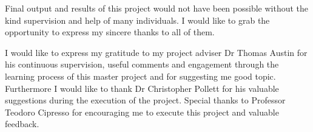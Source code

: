 Final output and results of this project would not have been possible without the kind supervision and help of many individuals. I would like to grab the opportunity to express my sincere thanks to all of them.

I would like to express my gratitude to my project adviser Dr Thomas Austin for his continuous supervision, useful comments and engagement through the learning process of this master project and for suggesting me good topic. Furthermore I would like to thank Dr Christopher Pollett for his valuable suggestions during the execution of the project. Special thanks to Professor Teodoro Cipresso for encouraging me to execute this project and valuable feedback. 


